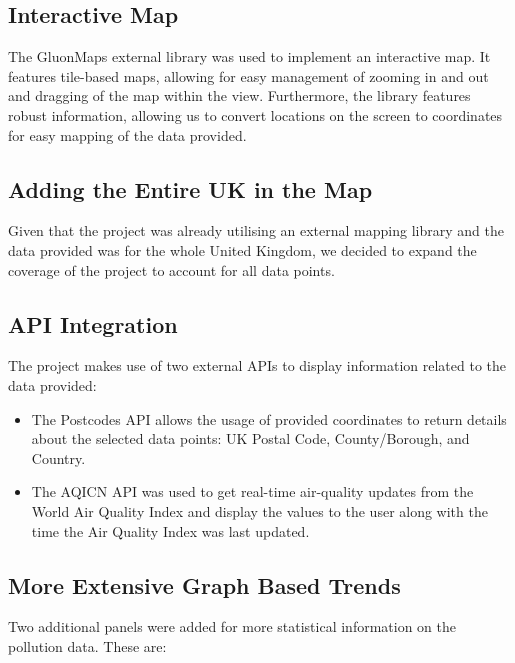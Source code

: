 \documentclass[10pt, a4paper]{scrartcl}
\begin{document}
\begin{multicols}{2}
\subsection{Interactive Map}

\noindent The GluonMaps external library was used to implement an interactive map. It features tile-based maps, allowing for easy
management of zooming in and out and dragging of the map within the view. Furthermore, the library features robust
information, allowing us to convert locations on the screen to coordinates for easy mapping of the data provided.
    
\subsection{Adding the Entire UK in the Map}

\noindent Given that the project was already utilising an external mapping library and the data provided was for the whole
United Kingdom, we decided to expand the coverage of the project to account for all data points.
    
\subsection{API Integration} \label{api-integration}

\noindent The project makes use of two external APIs to display information related to the data provided:

\begin{itemize}
    \itemsep-0.3em
    \item The Postcodes API allows the usage of provided coordinates to return details about the selected data points:
    UK Postal Code, County/Borough, and Country. 
    
    \item The AQICN API was used to get real-time air-quality updates from the World Air Quality Index and display the values
    to the user along with the time the Air Quality Index was last updated.
\end{itemize}
    
\subsection{More Extensive Graph Based Trends}

\noindent Two additional panels were added for more statistical information on the pollution data. These are:


\end{multicols}
\end{document}
